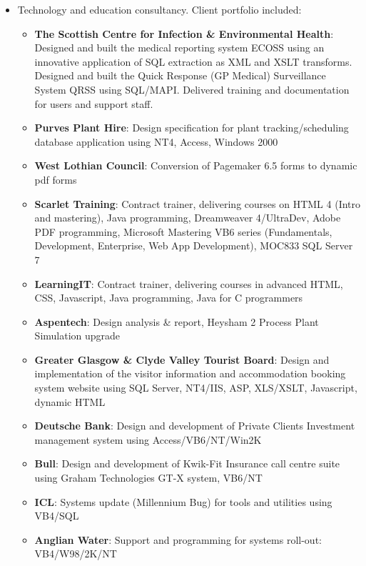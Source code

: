 \documentclass[10pt]{article}
\newenvironment{outerlist}[1][\enskip\textbullet]%
        {\begin{itemize}[#1]}{\end{itemize}%
         \vspace{-.6\baselineskip}}
\begin{document}
\begin{outerlist}
\item[] Technology and education consultancy. Client portfolio included:

\begin{outerlist}

\item \textbf{The Scottish Centre for Infection \& Environmental Health}:		Designed and built the medical reporting system ECOSS using an innovative application of SQL extraction as XML and XSLT transforms. Designed and built the Quick Response (GP Medical) Surveillance System QRSS using SQL/MAPI. Delivered training and documentation for users and support staff.
\item \textbf{Purves Plant Hire}: Design specification for plant tracking/scheduling database application using NT4, Access, Windows 2000
\item \textbf{West Lothian Council}: Conversion of Pagemaker 6.5 forms to dynamic pdf forms
\item \textbf{Scarlet Training}: Contract trainer, delivering courses on HTML 4 (Intro and mastering), Java programming, Dreamweaver 4/UltraDev, Adobe PDF programming, Microsoft Mastering VB6 series (Fundamentals, Development, Enterprise, Web App Development), MOC833 SQL Server 7
\item \textbf{LearningIT}: Contract trainer, delivering courses in advanced HTML, CSS, Javascript, Java programming, Java for C programmers
\item \textbf{Aspentech}: Design analysis \& report, Heysham 2 Process Plant Simulation upgrade
\item \textbf{Greater Glasgow \& Clyde Valley Tourist Board}: Design and implementation of the visitor information and accommodation booking system website using SQL Server, NT4/IIS, ASP, XLS/XSLT, Javascript, dynamic HTML
\item \textbf{Deutsche Bank}:	Design and development of Private Clients Investment management system using Access/VB6/NT/Win2K
\item \textbf{Bull}: Design and development of Kwik-Fit Insurance call centre suite using Graham Technologies GT-X system, VB6/NT
\item \textbf{ICL}: Systems update (Millennium Bug) for tools and utilities using VB4/SQL
\item \textbf{Anglian Water}: Support and programming for systems roll-out: VB4/W98/2K/NT

\end{outerlist}
\end{outerlist}
\end{document}
